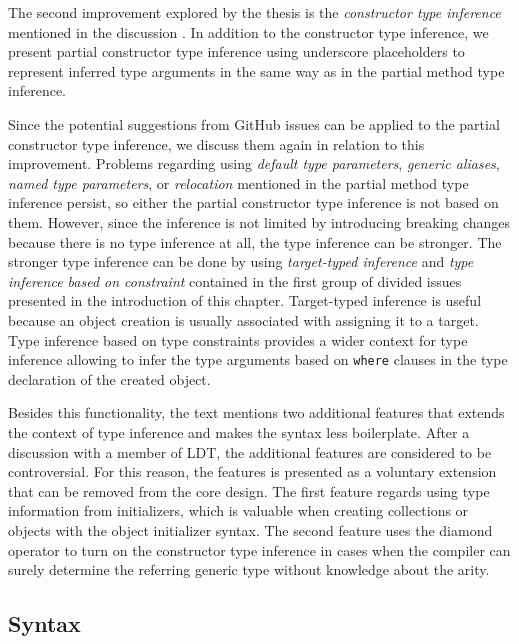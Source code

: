 The second improvement explored by the thesis is the \textit{constructor type inference} mentioned in the discussion \cite{online:CtorTInf}. 
In addition to the constructor type inference, we present partial constructor type inference using underscore placeholders to represent inferred type arguments in the same way as in the partial method type inference.
\par
Since the potential suggestions from GitHub issues can be applied to the partial constructor type inference, we discuss them again in relation to this improvement.
Problems regarding using \textit{default type parameters}, \textit{generic aliases}, \textit{named type parameters}, or \textit{relocation} mentioned in the partial method type inference persist, so either the partial constructor type inference is not based on them.
However, since the inference is not limited by introducing breaking changes because there is no type inference at all, the type inference can be stronger. 
The stronger type inference can be done by using \textit{target-typed inference} and \textit{type inference based on constraint} contained in the first group of divided issues presented in the introduction of this chapter.
Target-typed inference is useful because an object creation is usually associated with assigning it to a target. 
Type inference based on type constraints provides a wider context for type inference allowing to infer the type arguments based on \texttt{where} clauses in the type declaration of the created object. 
\par
Besides this functionality, the text mentions two additional features that extends the context of type inference and makes the syntax less boilerplate.
After a discussion with a member of \ac{LDT}, the additional features are considered to be controversial. 
For this reason, the features is presented as a voluntary extension that can be removed from the core design. 
The first feature regards using type information from initializers, which is valuable when creating collections or objects with the object initializer syntax. 
The second feature uses the diamond operator to turn on the constructor type inference in cases when the compiler can surely determine the referring generic type without knowledge about the arity.

\subsection{Syntax}

